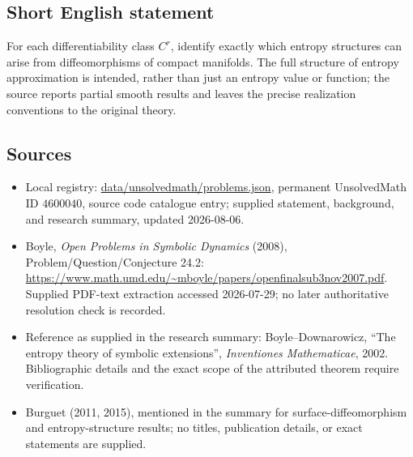 \documentclass[11pt]{article}
\begin{document}
\subsection{Short English statement}
For each differentiability class \(C^r\), identify exactly which entropy structures can arise from diffeomorphisms of compact manifolds. The full structure of entropy approximation is intended, rather than just an entropy value or function; the source reports partial smooth results and leaves the precise realization conventions to the original theory.
\subsection{Sources}
\begin{itemize}
\item Local registry: \url{data/unsolvedmath/problems.json}, permanent UnsolvedMath ID \(4600040\), source code catalogue entry; supplied statement, background, and research summary, updated 2026-08-06.
\item Boyle, \emph{Open Problems in Symbolic Dynamics} (2008), Problem/Question/Conjecture 24.2: \url{https://www.math.umd.edu/~mboyle/papers/openfinalsub3nov2007.pdf}. Supplied PDF-text extraction accessed 2026-07-29; no later authoritative resolution check is recorded.
\item Reference as supplied in the research summary: Boyle--Downarowicz, ``The entropy theory of symbolic extensions'', \emph{Inventiones Mathematicae}, 2002. Bibliographic details and the exact scope of the attributed theorem require verification.
\item Burguet (2011, 2015), mentioned in the summary for surface-diffeomorphism and entropy-structure results; no titles, publication details, or exact statements are supplied.
\end{itemize}
\end{document}
